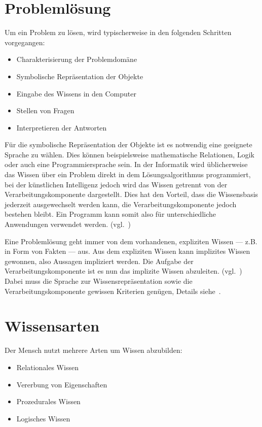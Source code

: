 \section{Problemlösung}
\label{sec:experten_systeme_problemloesung}
Um ein Problem zu lösen, wird typischerweise in den folgenden Schritten vorgegangen:
\begin{itemize}
    \item Charakterisierung der Problemdomäne
    \item Symbolische Repräsentation der Objekte
    \item Eingabe des Wissens in den Computer
    \item Stellen von Fragen
    \item Interpretieren der Antworten
\end{itemize}

Für die symbolische Repräsentation der Objekte ist es notwendig eine geeignete Sprache zu wählen. Dies können beispielsweise mathematische Relationen, Logik oder auch eine Programmiersprache sein. In der Informatik wird üblicherweise das Wissen über ein Problem direkt in dem Lösungsalgorithmus programmiert, bei der künstlichen Intelligenz jedoch wird das Wissen getrennt von der Verarbeitungskomponente dargestellt. Dies hat den Vorteil, dass die Wissensbasis jederzeit ausgewechselt werden kann, die Verarbeitungskomponente jedoch bestehen bleibt. Ein Programm kann somit also für unterschiedliche Anwendungen verwendet werden. (vgl.~\cite[S. 28 - 30]{laemmel})

Eine Problemlösung geht immer von dem vorhandenen, expliziten Wissen --- z.B. in Form von Fakten --- aus. Aus dem expliziten Wissen kann implizites Wissen gewonnen, also Aussagen impliziert werden. Die Aufgabe der Verarbeitungskomponente ist es nun das implizite Wissen abzuleiten. (vgl.~\cite[S. 30 - 31]{laemmel}) Dabei muss die Sprache zur Wissensrepräsentation sowie die Verarbeitungskomponente gewissen Kriterien genügen, Details siehe~\cite[S. 31]{laemmel}.

\section{Wissensarten}
\label{sec:experten_systeme_wissensarten}
Der Mensch nutzt mehrere Arten um Wissen abzubilden:
\begin{itemize}
    \item Relationales Wissen
    \item Vererbung von Eigenschaften
    \item Prozedurales Wissen
    \item Logisches Wissen
\end{itemize}
\label{itm:wissensarten}

